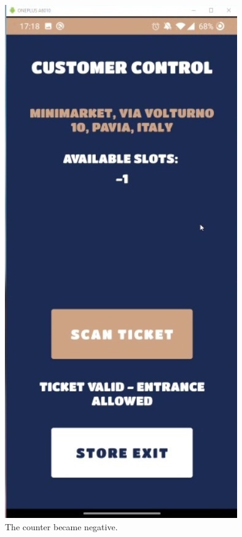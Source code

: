 \documentclass[table, 12pt]{article}
\begin{document}
\begin{figure}[H]
    \centering
    \includegraphics[width=\textwidth/3]{assets/screenshots/oh_no.jpg}
    \caption{The counter became negative.}
    \label{counter_going_brr}
\end{figure}
\end{document}
